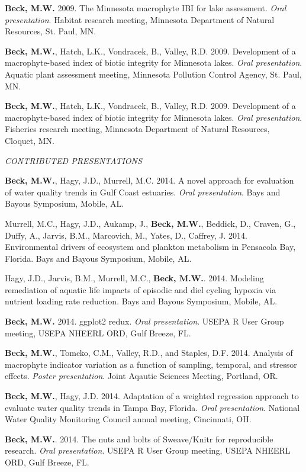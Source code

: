 \documentclass[letterpaper,12pt]{article}
\begin{document}
{\bf Beck, M.W.} 2009. The Minnesota macrophyte IBI for lake assessment. \textit{Oral presentation}. Habitat research meeting, Minnesota Department of Natural Resources, St. Paul, MN.

{\bf Beck, M.W.}, Hatch, L.K., Vondracek, B., Valley, R.D. 2009. Development of a macrophyte-based index of biotic integrity for Minnesota lakes. \textit{Oral presentation}. Aquatic plant assessment meeting, Minnesota Pollution Control Agency, St. Paul, MN.

{\bf Beck, M.W.}, Hatch, L.K., Vondracek, B., Valley, R.D. 2009. Development of a macrophyte-based index of biotic integrity for Minnesota lakes. \textit{Oral presentation}. Fisheries research meeting, Minnesota Department of Natural Resources, Cloquet, MN.

\vspace{\baselineskip} 
\centerline{\large{\textit{CONTRIBUTED PRESENTATIONS}}}

{\bf Beck, M.W.}, Hagy, J.D., Murrell, M.C. 2014. A novel approach for evaluation of water quality trends in Gulf Coast estuaries. \textit{Oral presentation}. Bays and Bayous Symposium, Mobile, AL.

Murrell, M.C., Hagy, J.D., Aukamp, J., {\bf Beck, M.W.}, Beddick, D., Craven, G., Duffy, A., Jarvis, B.M., Marcovich, M., Yates, D., Caffrey, J. 2014. Environmental drivers of ecosystem and plankton metabolism in Pensacola Bay, Florida. Bays and Bayous Symposium, Mobile, AL. 

Hagy, J.D., Jarvis, B.M., Murrell, M.C., {\bf Beck, M.W.}. 2014. Modeling remediation of aquatic life impacts of episodic and diel cycling hypoxia via nutrient loading rate reduction. Bays and Bayous Symposium, Mobile, AL. 

{\bf Beck, M.W.} 2014. ggplot2 redux. \textit{Oral presentation}. USEPA R User Group meeting, USEPA NHEERL ORD, Gulf Breeze, FL.

{\bf Beck, M.W.}, Tomcko, C.M., Valley, R.D., and Staples, D.F. 2014. Analysis of macrophyte indicator variation as a function of sampling, temporal, and stressor effects. \textit{Poster presentation}. Joint Aqautic Sciences Meeting, Portland, OR.

{\bf Beck, M.W.}, Hagy, J.D. 2014. Adaptation of a weighted regression approach to evaluate water quality trends in {T}ampa {B}ay, {F}lorida. \textit{Oral presentation}. National Water Quality Monitoring Council annual meeting, Cincinnati, OH.

{\bf Beck, M.W.}. 2014. The nuts and bolts of Sweave/Knitr for reproducible research. \textit{Oral presentation}. USEPA R User Group meeting, USEPA NHEERL ORD, Gulf Breeze, FL.
\end{document}
